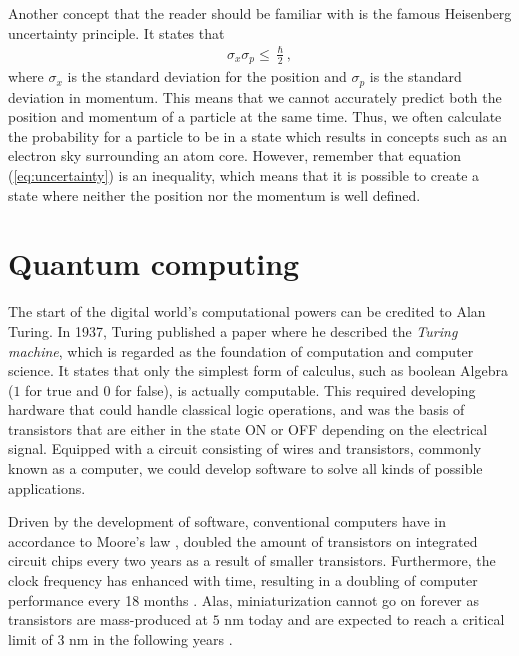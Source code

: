 
Another concept that the reader should be familiar with is the famous Heisenberg uncertainty principle. It states that
\begin{align}
    \sigma_x \sigma_p \leq \frac{\hslash}{2},
    \label{eq:uncertainty}
\end{align}
where $\sigma_x$ is the standard deviation for the position and $\sigma_p$ is the standard deviation in momentum. This means that we cannot accurately predict both the position and momentum of a particle at the same time. Thus, we often calculate the probability for a particle to be in a state which results in concepts such as an electron sky surrounding an atom core. However, remember that equation (\ref{eq:uncertainty}) is an inequality, which means that it is possible to create a state where neither the position nor the momentum is well defined.

\section{Quantum computing}
The start of the digital world's computational powers can be credited to Alan Turing. In 1937, Turing \cite{Turing1937} published a paper where he described the \textit{Turing machine}, which is regarded as the foundation of computation and computer science. It states that only the simplest form of calculus, such as boolean Algebra ($1$ for true and $0$ for false), is actually computable. This required developing hardware that could handle classical logic operations, and was the basis of transistors that are either in the state ON or OFF depending on the electrical signal. Equipped with a circuit consisting of wires and transistors, commonly known as a computer, we could develop software to solve all kinds of possible applications.

Driven by the development of software, conventional computers have in accordance to Moore's law \cite{Moore1965}, doubled the amount of transistors on integrated circuit chips every two years as a result of smaller transistors. Furthermore, the clock frequency has enhanced with time, resulting in a doubling of computer performance every 18 months \cite{Pavicic2006}. Alas, miniaturization cannot go on forever as transistors are mass-produced at $5$ nm today and are expected to reach a critical limit of $3$ nm in the following years \cite{Gwennap2020}.

